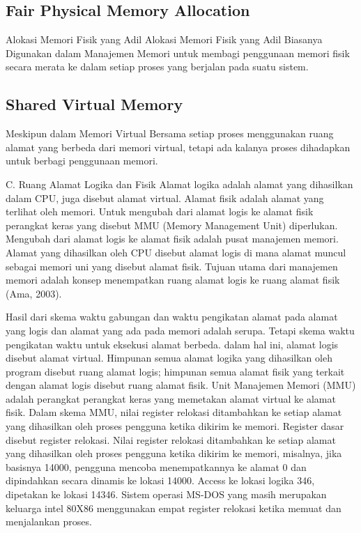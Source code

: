 \subsection {Fair Physical Memory Allocation}
Alokasi Memori Fisik yang Adil
Alokasi Memori Fisik yang Adil Biasanya Digunakan dalam Manajemen Memori untuk membagi penggunaan memori fisik secara merata ke dalam setiap proses yang berjalan pada suatu sistem.

\subsection {Shared Virtual Memory}
Meskipun dalam Memori Virtual Bersama setiap proses menggunakan ruang alamat yang berbeda dari memori virtual, tetapi ada kalanya proses dihadapkan untuk berbagi penggunaan memori.

C. Ruang Alamat Logika dan Fisik
Alamat logika adalah alamat yang dihasilkan dalam CPU, juga disebut alamat virtual. Alamat fisik adalah alamat yang terlihat oleh memori. Untuk mengubah dari alamat logis ke alamat fisik perangkat keras yang disebut MMU (Memory Management Unit) diperlukan. Mengubah dari alamat logis ke alamat fisik adalah pusat manajemen memori. Alamat yang dihasilkan oleh CPU disebut alamat logis di mana alamat muncul sebagai memori uni yang disebut alamat fisik. Tujuan utama dari manajemen memori adalah konsep menempatkan ruang alamat logis ke ruang alamat fisik (Ama, 2003).

Hasil dari skema waktu gabungan dan waktu pengikatan alamat pada alamat yang logis dan alamat yang ada pada memori adalah serupa. Tetapi skema waktu pengikatan waktu untuk eksekusi alamat berbeda. dalam hal ini, alamat logis disebut alamat virtual. Himpunan semua alamat logika yang dihasilkan oleh program disebut ruang alamat logis; himpunan semua alamat fisik yang terkait dengan alamat logis disebut ruang alamat fisik.
Unit Manajemen Memori (MMU) adalah perangkat perangkat keras yang memetakan alamat virtual ke alamat fisik. Dalam skema MMU, nilai register relokasi ditambahkan ke setiap alamat yang dihasilkan oleh proses pengguna ketika dikirim ke memori.
Register dasar disebut register relokasi. Nilai register relokasi ditambahkan ke setiap alamat yang dihasilkan oleh proses pengguna ketika dikirim ke memori, misalnya, jika basisnya 14000, pengguna mencoba menempatkannya ke alamat 0 dan dipindahkan secara dinamis ke lokasi 14000. Access ke lokasi logika 346, dipetakan ke lokasi 14346. Sistem operasi MS-DOS yang masih merupakan keluarga intel 80X86 menggunakan empat register relokasi ketika memuat dan menjalankan proses.
